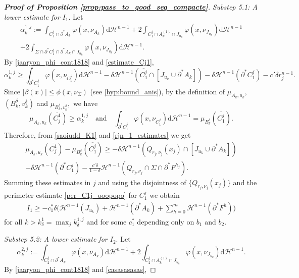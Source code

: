 \documentclass[reqno]{amsart}
\numberwithin{equation}{section}
\theoremstyle{plain}
\theoremstyle{definition}
\newcommand{\cH}{\mathcal{H}}
\newcommand{\p}{\partial}
\newcommand{\cl}[1]{\overline{#1}}
\newcommand{\bound}{b}
\renewcommand{\d}{\mathrm{d}}
\begin{document}
\begin{proof}[\textbf{Proof of Proposition \ref{prop:pass_to_good_seq_compacte}}]
{\it Substep 5.1: A lower estimate for $I_1.$} 
Let 
\begin{multline*}
\alpha_k^{1,j}:= \int_{C_1^j\cap\p^*A_k} \varphi(x,\nu_{A_k})\d\cH^{n-1} +  2\int_{C_1^j \cap A_k^{(1)} \cap J_{u_k}}  \varphi(x,\nu_{J_{u_k}}) \d\cH^{n-1}\\
+ 2 \int_{\Sigma\cap \p^* C_1^j \cap \p^*A_k \cap J_{u_k}} \varphi(x,\nu_{J_{u_k}}) \d\cH^{n-1}.
\end{multline*}
By \eqref{jaaryon_phi_cont1818} and \eqref{estimate_Cj1},
\begin{equation}\label{saoiudd_K1}
\alpha_k^{1,j}\ge \int_{\p^* C_1^j} \varphi(x,\nu_{C_1^j})\d\cH^{n-1} - \delta \cH^{n-1}(\cl{C_1^j}\cap [J_{u_k}\cup \p^*A_k]) - \delta\cH^{n-1}(\p^* C_1^j) - c'\delta r_j^{n-1}.  
\end{equation}
Since $|\beta(x)|\le \phi(x,\nu_\Sigma)$ (see \eqref{hyp:bound_anis}), by the definition of $\mu_{A_k,u_k},$ $(B_k^\delta,v_k^\delta)$ and $\mu_{B_k^\delta,v_k^\delta},$ we have
$$
\mu_{A_k,u_k}(\cl{C_j^1}) \ge \alpha_k^{1,j}
\quad \text{and}\quad
\int_{\p^* C_1^j} \varphi(x,\nu_{C_1^j})\d\cH^{n-1} = \mu_{B_k^\delta}(\cl{C_1^j}).
$$
Therefore, from \eqref{saoiudd_K1} and \eqref{rjn_1_estimates} we get
\begin{multline*}
\mu_{A_k,u_k}(\cl{C_j^1})  - \mu_{B_k^\delta}(\cl{C_1^j}) 
\ge 
- \delta \cH^{n-1}(Q_{r_j,\nu_j}(x_j) \cap [J_{u_k}\cup \p^*A_k]) \\
- \delta\cH^{n-1}(\p^* C_1^j) - \frac{c'\delta}{1-\delta} \cH^{n-1}(Q_{r_j,\nu_j}\cap \Sigma\cap \p^*F^{h_j}).
\end{multline*}
Summing these estimates in $j$ and using the disjointness of $\{Q_{r_j,\nu_j}(x_j)\}$ and the perimeter estimate \eqref{per_C1j_ooopopo} for $C_1^j$ we obtain
\begin{align}\label{estimatos_I1osos}
I_1 \ge - c_1^*\delta \Big(\cH^{n-1}(J_{u_k}) + \cH^{n-1}(\p^*A_k) + \sum\limits_{h=0}^m \cH^{n-1}(\p^*F^h)\Big)
\end{align}
for all $k>k_\delta^1=\max_jk_\delta^{1,j}$ and for some $c_1^*$ depending only on $\bound_1$ and $\bound_2.$

{\it Substep 5.2: A lower estimate for $I_2.$} Let 
$$
\alpha_k^{2,j}:= \int_{C_2^j\cap\p^*A_k} \varphi(x,\nu_{A_k})\d\cH^{n-1}  +   2\int_{C_2^j \cap A_k^{(1)} \cap J_{u_k}}   \varphi(x,\nu_{J_{u_k}}) \d\cH^{n-1}.
$$
By \eqref{jaaryon_phi_cont1818} and \eqref{casasasasas},


\end{proof}
\end{document}

